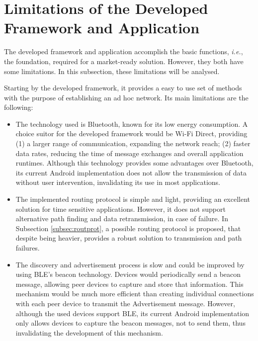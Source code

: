 \section{Limitations of the Developed Framework and Application}

The developed framework and application accomplish the basic functions, \textit{i.e.}, the foundation, required for a market-ready solution. However, they both have some limitations. In this subsection, these limitations will be analysed.

Starting by the developed framework, it provides a easy to use set of methods with the purpose of establishing an ad hoc network. Its main limitations are the following:

\begin{itemize}
	\item The technology used is Bluetooth, known for its low energy consumption. A choice suitor for the developed framework would be Wi-Fi Direct, providing (1) a larger range of communication, expanding the network reach; (2) faster data rates, reducing the time of message exchanges and overall application runtimes. Although this technology provides some advantages over Bluetooth, its current Android implementation does not allow the transmission of data without user intervention, invalidating its use in most applications.
	 
	\item The implemented routing protocol is simple and light, providing an excellent solution for time sensitive applications. However, it does not support alternative path finding and data retransmission, in case of failure. In Subsection \ref{subsec:routprot}, a possible routing protocol is proposed, that despite being heavier, provides a robust solution to transmission and path failures.
	
	\item The discovery and advertisement process is slow and could be improved by using \gls{BLE}'s beacon technology. Devices would periodically send a beacon message, allowing peer devices to capture and store that information. This mechanism would be much more efficient than creating individual connections with each peer device to transmit the Advertisement message. However, although the used devices support \gls{BLE}, its current Android implementation only allows devices to capture the beacon messages, not to send them, thus invalidating the development of this mechanism.
	
\end{itemize}

